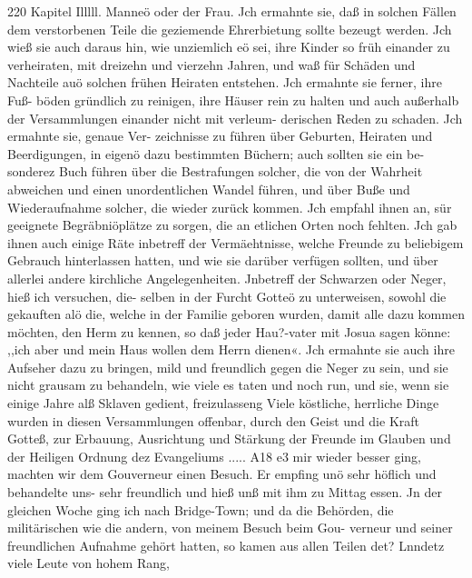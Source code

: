 220 Kapitel Illlll.
Manneö oder der Frau. Jch ermahnte sie, daß in solchen Fällen
dem verstorbenen Teile die geziemende Ehrerbietung sollte bezeugt
werden. Jch wieß sie auch daraus hin, wie unziemlich eö sei,
ihre Kinder so früh einander zu verheiraten, mit dreizehn und
vierzehn Jahren, und waß für Schäden und Nachteile auö solchen
frühen Heiraten entstehen. Jch ermahnte sie ferner, ihre Fuß-
böden gründlich zu reinigen, ihre Häuser rein zu halten und auch
außerhalb der Versammlungen einander nicht mit verleum-
derischen Reden zu schaden. Jch ermahnte sie, genaue Ver-
zeichnisse zu führen über Geburten, Heiraten und Beerdigungen,
in eigenö dazu bestimmten Büchern; auch sollten sie ein be-
sonderez Buch führen über die Bestrafungen solcher, die von der
Wahrheit abweichen und einen unordentlichen Wandel führen,
und über Buße und Wiederaufnahme solcher, die wieder zurück
kommen. Jch empfahl ihnen an, sür geeignete Begräbniöplätze
zu sorgen, die an etlichen Orten noch fehlten. Jch gab ihnen
auch einige Räte inbetreff der Vermäehtnisse, welche Freunde zu
beliebigem Gebrauch hinterlassen hatten, und wie sie darüber
verfügen sollten, und über allerlei andere kirchliche Angelegenheiten.
 Jnbetreff der Schwarzen oder Neger, hieß ich versuchen, die-
selben in der Furcht Gotteö zu unterweisen, sowohl die gekauften
alö die, welche in der Familie geboren wurden, damit alle dazu
kommen möchten, den Herm zu kennen, so daß jeder Hau?-vater
mit Josua sagen könne: ,,ich aber und mein Haus wollen dem
Herrn dienen«. Jch ermahnte sie auch ihre Aufseher dazu zu
bringen, mild und freundlich gegen die Neger zu sein, und sie
nicht grausam zu behandeln, wie viele es taten und noch run,
und sie, wenn sie einige Jahre alß Sklaven gedient, freizulasseng
Viele köstliche, herrliche Dinge wurden in diesen Versammlungen
offenbar, durch den Geist und die Kraft Gotteß, zur Erbauung,
Ausrichtung und Stärkung der Freunde im Glauben und der
Heiligen Ordnung dez Evangeliums .....
A18 e3 mir wieder besser ging, machten wir dem Gouverneur
einen Besuch. Er empfing unö sehr höflich und behandelte uns-
sehr freundlich und hieß unß mit ihm zu Mittag essen. Jn der
gleichen Woche ging ich nach Bridge-Town; und da die Behörden,
die militärischen wie die andern, von meinem Besuch beim Gou-
verneur und seiner freundlichen Aufnahme gehört hatten, so kamen
aus allen Teilen det? Lnndetz viele Leute von hohem Rang,


